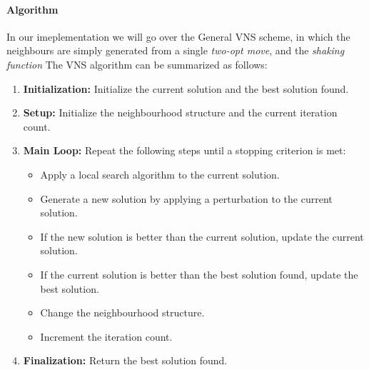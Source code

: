 \documentclass{article}
\begin{document}
\paragraph{Algorithm}
In our imeplementation we will go over the General VNS scheme, in which the neighbours are simply generated from a single \textit{two-opt move}, and the \textit{shaking function} 
The VNS algorithm can be summarized as follows:
\begin{enumerate}
	\item \textbf{Initialization:} Initialize the current solution and the best solution found.
	\item \textbf{Setup:} Initialize the neighbourhood structure and the current iteration count.
	\item \textbf{Main Loop:} Repeat the following steps until a stopping criterion is met:
		  \begin{itemize}
			  \item Apply a local search algorithm to the current solution.
			  \item Generate a new solution by applying a perturbation to the current solution.
			  \item If the new solution is better than the current solution, update the current solution.
			  \item If the current solution is better than the best solution found, update the best solution.
			  \item Change the neighbourhood structure.
			  \item Increment the iteration count.
		  \end{itemize}
	\item \textbf{Finalization:} Return the best solution found.
\end{enumerate}
\end{document}
